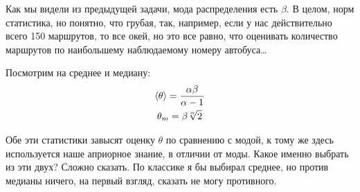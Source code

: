 \begin{solution}
    Как мы видели из предыдущей задачи, мода распределения есть $\beta$. В целом, норм статистика, но понятно, что грубая, так, например, если у нас действительно всего 150 маршрутов, то все окей, но это все равно, что оценивать количество маршрутов по наибольшему наблюдаемому номеру автобуса\ldots

    Посмотрим на среднее и медиану:
    \begin{gather}
        \braket{\theta} = \frac{\alpha \beta}{\alpha - 1} \\
        \theta_m = \beta \sqrt[\alpha]{2}
    \end{gather}

    Обе эти статистики завысят оценку $\theta$ по сравнению с модой, к тому же здесь используется наше априорное знание, в отличии от моды. Какое именно выбрать из эти двух? Сложно сказать. По классике я бы выбирал среднее, но против медианы ничего, на первый взгляд, сказать не могу противного.

\end{solution}

\newpage
